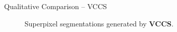 \documentclass[handout]{beamer}
\begin{document}
	\begin{frame}{Qualitative Comparison -- VCCS}
		\begin{figure}
   			\centering
   			\caption{Superpixel segmentations generated by \textbf{VCCS}.}
   		\end{figure}
	\end{frame}
	
%		
\end{document}
